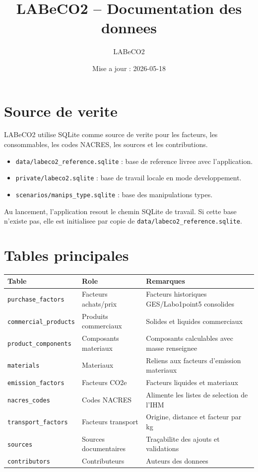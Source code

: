 \documentclass[11pt,a4paper]{article}
\title{LABeCO2 -- Documentation des donnees}
\author{LABeCO2}
\date{Mise a jour : 2026-05-18}
\begin{document}
\maketitle

\section{Source de verite}

LABeCO2 utilise SQLite comme source de verite pour les facteurs, les
consommables, les codes NACRES, les sources et les contributions.

\begin{itemize}
  \item \texttt{data/labeco2\_reference.sqlite} : base de reference livree avec l'application.
  \item \texttt{private/labeco2.sqlite} : base de travail locale en mode developpement.
  \item \texttt{scenarios/manips\_type.sqlite} : base des manipulations types.
\end{itemize}

Au lancement, l'application resout le chemin SQLite de travail. Si cette base
n'existe pas, elle est initialisee par copie de
\texttt{data/labeco2\_reference.sqlite}.

\section{Tables principales}

\begin{tabular}{lll}
\toprule
Table & Role & Remarques \\
\midrule
\texttt{purchase\_factors} & Facteurs achats/prix & Facteurs historiques GES/Labo1point5 consolides \\
\texttt{commercial\_products} & Produits commerciaux & Solides et liquides commerciaux \\
\texttt{product\_components} & Composants materiaux & Composants calculables avec masse renseignee \\
\texttt{materials} & Materiaux & Reliens aux facteurs d'emission materiaux \\
\texttt{emission\_factors} & Facteurs CO2e & Facteurs liquides et materiaux \\
\texttt{nacres\_codes} & Codes NACRES & Alimente les listes de selection de l'IHM \\
\texttt{transport\_factors} & Facteurs transport & Origine, distance et facteur par kg \\
\texttt{sources} & Sources documentaires & Traçabilite des ajouts et validations \\
\texttt{contributors} & Contributeurs & Auteurs des donnees \\
\bottomrule
\end{tabular}
\end{document}
